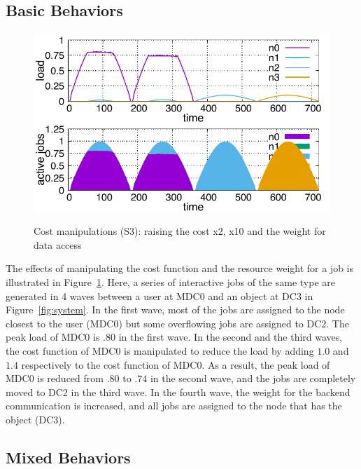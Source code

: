 \subsection{Basic Behaviors}

\begin{figure}[tb]
  \begin{center}
    \includegraphics[width=1.0\columnwidth]{lowering.pdf}
    \vspace{-2.0ex}
    \caption{Cost manipulations (S3): raising the cost x2,
      x10 and the weight for data access}
    \label{fig:lowering}
  \end{center}
\end{figure}

The effects of manipulating the cost function and the resource weight
for a job is illustrated in Figure~\ref{fig:lowering}.
Here, a series of interactive jobs of the same type are generated in
4 waves between a user at MDC0 and an object at DC3 in
Figure~\ref{fig:system}.
In the first wave,  most of the jobs are assigned to the node closest
to the user (MDC0) but some overflowing jobs are assigned to DC2.
The peak load of MDC0 is .80 in the first wave.
In the second and the third waves, the cost function of MDC0 is
manipulated to reduce the load by adding $1.0$ and $1.4$ respectively to
the cost function of MDC0. As a result, the peak load of MDC0 is
reduced from $.80$ to $.74$ in the second wave, and the jobs are
completely moved to DC2 in the third wave.
In the fourth wave, the weight for the backend communication is
increased, and all jobs are assigned to the node that has the object
(DC3).

\subsection{Mixed Behaviors}

